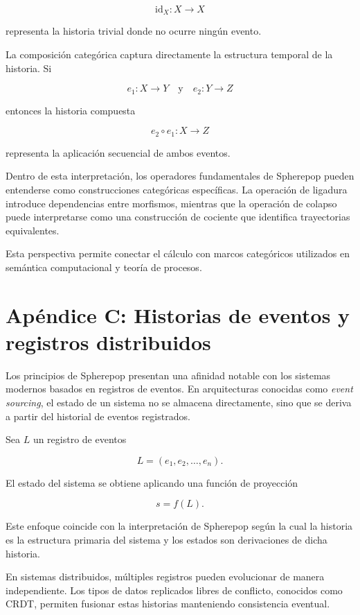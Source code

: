 \documentclass[12pt]{article}
\begin{document}
\[
\mathrm{id}_X : X \rightarrow X
\]

representa la historia trivial donde no ocurre ningún evento.

La composición categórica captura directamente la estructura temporal de la historia. Si

\[
e_1 : X \rightarrow Y
\quad\text{y}\quad
e_2 : Y \rightarrow Z
\]

entonces la historia compuesta

\[
e_2 \circ e_1 : X \rightarrow Z
\]

representa la aplicación secuencial de ambos eventos.

Dentro de esta interpretación, los operadores fundamentales de Spherepop pueden entenderse como construcciones categóricas específicas. La operación de ligadura introduce dependencias entre morfismos, mientras que la operación de colapso puede interpretarse como una construcción de cociente que identifica trayectorias equivalentes.

Esta perspectiva permite conectar el cálculo con marcos categóricos utilizados en semántica computacional y teoría de procesos.

\section{Apéndice C: Historias de eventos y registros distribuidos}

Los principios de Spherepop presentan una afinidad notable con los sistemas modernos basados en registros de eventos. En arquitecturas conocidas como \emph{event sourcing}, el estado de un sistema no se almacena directamente, sino que se deriva a partir del historial de eventos registrados.

Sea \(L\) un registro de eventos

\[
L = (e_1,e_2,\ldots,e_n).
\]

El estado del sistema se obtiene aplicando una función de proyección

\[
s = f(L).
\]

Este enfoque coincide con la interpretación de Spherepop según la cual la historia es la estructura primaria del sistema y los estados son derivaciones de dicha historia.

En sistemas distribuidos, múltiples registros pueden evolucionar de manera independiente. Los tipos de datos replicados libres de conflicto, conocidos como CRDT, permiten fusionar estas historias manteniendo consistencia eventual.
\end{document}
